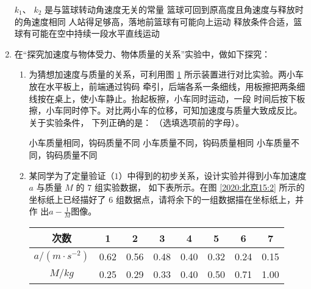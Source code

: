 \begin{enumerate}
\fourchoices
{$ k_{1} $、 $ k_{2} $ 是与篮球转动角速度无关的常量}
{篮球可回到原高度且角速度与释放时的角速度相同}
{人站得足够高，落地前篮球有可能向上运动}
{释放条件合适，篮球有可能在空中持续一段水平直线运动}





\gaokaosy

\item
在“探究加速度与物体受力、物体质量的关系”实验中，做如下探究：
\begin{figure}[h!]
\centering

\caption{}\label{2020:北京15:1}
\end{figure}
\begin{enumerate}
\item
为猜想加速度与质量的关系，可利用图 \ref{2020:北京15:1} 所示装置进行对比实验。两小车放在水平板上，前端通过钩码
牵引，后端各系一条细线，用板擦把两条细线按在桌上，使小车静止。抬起板擦，小车同时运动，一段
时间后按下板擦，小车同时停下。对比两小车的位移，可知加速度与质量大致成反比。关于实验条件，
下列正确的是：
\underlinegap 
（选填选项前的字母）。


\threechoices
{小车质量相同，钩码质量不同}
{小车质量不同，钩码质量相同}
{小车质量不同，钩码质量不同}

\item 
某同学为了定量验证（$ 1 $）中得到的初步关系，设计实验并得到小车加速度 $ a $ 与质量 $ M $ 的 $ 7 $ 组实验数据，
如下表所示。在图 \ref{2020:北京15:2} 所示的坐标纸上已经描好了 $ 6 $ 组数据点，请将余下的一组数据描在坐标纸上，并作
出$a-\frac{1}{M}$图像。
\begin{table}[h!]
\centering 
\begin{tabular}{|c|c|c|c|c|c|c|c|}
\hline 次数 & 1 & 2 & 3 & 4 & 5 & 6 & 7 \\
\hline$a /\left(m \cdot s^{-2}\right)$ & 0.62 & 0.56 & 0.48 & 0.40 & 0.32 & 0.24 & 0.15 \\
\hline$M / kg$ & 0.25 & 0.29 & 0.33 & 0.40 & 0.50 & 0.71 & 1.00 \\
\hline
\end{tabular}
\end{table} 
\begin{figure}[h!]
\centering
{}
\end{figure}
\end{enumerate}
\end{enumerate}
